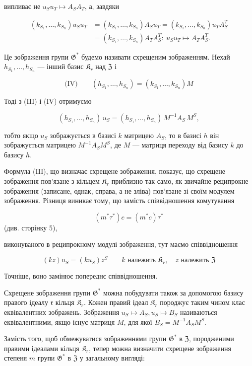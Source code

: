 \documentclass[11pt]{article}
\begin{document}
випливає не \(u_Su_T \mapsto A_SA_T\), а, завдяки

\[
\begin{aligned}
(k_{S_1}, \ldots, k_{S_n})u_Su_T
&=(k_{S_1}, \ldots, k_{S_n})A_Su_T
=(k_{S_1}, \ldots, k_{S_n})u_TA_S^T\\
&=(k_{S_1}, \ldots, k_{S_n})A_TA_S^T:\ u_Su_T\mapsto A_TA_S^T.
\end{aligned}
\]

Це зображення групи \(\mathfrak{G}^*\) будемо називати схрещеним зображенням. Нехай \(h_{S_1}, \ldots, h_{S_n}\) --- інший базис \(\mathfrak{K}_r\) над \(\mathfrak{Z}\) і

\[
\text{(IV)}\qquad (h_{S_1}, \ldots, h_{S_n}) = (k_{S_1}, \ldots, k_{S_n})M
\]

Тоді з (III) і (IV) отримуємо

\[(h_{S_1},\ldots,h_{S_n})\,u_S=(h_{S_1},\ldots,h_{S_n})\,M^{-1}A_S\,M^S,\]

тобто якщо \(u_S\) зображується в базисі \(k\) матрицею \(A_S\), то в базисі \(h\) він зображується матрицею \(M^{-1}A_SM^S\), де \(M\) --- матриця переходу від базису \(k\) до базису \(h\).

Формула (III), що визначає схрещене зображення, показує, що схрещене зображення пов'язане з кільцем \(\mathfrak K_r\) приблизно так само, як звичайне реципрокне зображення (записане, однак, справа, а не зліва) пов'язане зі своїм модулем зображення. Різниця виникає тому, що замість співвідношення комутування

\[(m^*\tau^*)c = (m^*c)\tau^*\]
(див. сторінку 5),

виконуваного в реципрокному модулі зображення, тут маємо співвідношення

\[
(kz)u_S=(ku_S)z^S\qquad k\text{ належить }\mathfrak K_r,\quad z\text{ належить }\mathfrak Z
\]

Точніше, воно замінює попереднє співвідношення.

Схрещене зображення групи \(\mathfrak{G}^*\) можна побудувати також за допомогою базису правого ідеалу \(\mathfrak r\) кільця \(\mathfrak{K}_r\). Кожен правий ідеал \(\mathfrak{K}_r\) породжує таким чином клас еквівалентних зображень. Зображення \(u_S \mapsto A_S, u_S \mapsto B_S\) називаються еквівалентними, якщо існує матриця \(M\), для якої \(B_S = M^{-1}A_SM^S\).

Замість того, щоб обмежуватися зображеннями групи \(\mathfrak G^*\) в \(\mathfrak Z\), породженими правими ідеалами кільця \(\mathfrak K_r\), тепер можна визначити схрещене зображення степеня \(m\) групи \(\mathfrak G^*\) в \(\mathfrak Z\) у загальному вигляді:
\end{document}
